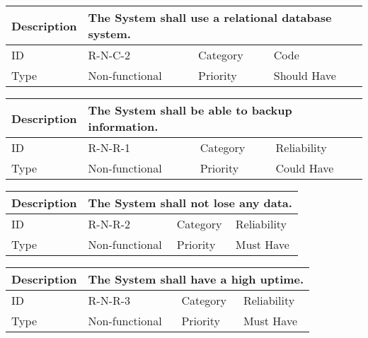 \begin{tabular}{|p{1.5cm}|p{1.5cm}|p{1.5cm}|p{1.5cm}|p{1.5cm}|p{1.5cm}|p{1.5cm}|p{1.5cm}|p{1.5cm}|p{1.5cm}|p{1.5cm}|p{1.5cm}|}
    \hline
    \multicolumn{2}{|o|}{Description} & \multicolumn{10}{p{12.5cm}|}{The System shall use a relational database system.} \\ \hline
    \multicolumn{2}{|o|}{ID}          & \multicolumn{4}{n}{R-N-C-2}            & \multicolumn{2}{|o|}{Category}    & \multicolumn{4}{n|}{Code} \\ \hline
    \multicolumn{2}{|o|}{Type}        & \multicolumn{4}{n}{Non-functional}     & \multicolumn{2}{|o|}{Priority}    & \multicolumn{4}{n|}{Should Have}  \\ \hline
\end{tabular}

\begin{tabular}{|p{1.5cm}|p{1.5cm}|p{1.5cm}|p{1.5cm}|p{1.5cm}|p{1.5cm}|p{1.5cm}|p{1.5cm}|p{1.5cm}|p{1.5cm}|p{1.5cm}|p{1.5cm}|}
    \hline
    \multicolumn{2}{|o|}{Description} & \multicolumn{10}{p{12.5cm}|}{The System shall be able to backup information.} \\ \hline
    \multicolumn{2}{|o|}{ID}          & \multicolumn{4}{n}{R-N-R-1}            & \multicolumn{2}{|o|}{Category}    & \multicolumn{4}{n|}{Reliability} \\ \hline
    \multicolumn{2}{|o|}{Type}        & \multicolumn{4}{n}{Non-functional}     & \multicolumn{2}{|o|}{Priority}    & \multicolumn{4}{n|}{Could Have}  \\ \hline
\end{tabular}

\begin{tabular}{|p{1.5cm}|p{1.5cm}|p{1.5cm}|p{1.5cm}|p{1.5cm}|p{1.5cm}|p{1.5cm}|p{1.5cm}|p{1.5cm}|p{1.5cm}|p{1.5cm}|p{1.5cm}|}
    \hline
    \multicolumn{2}{|o|}{Description} & \multicolumn{10}{p{12.5cm}|}{The System shall not lose any data.} \\ \hline
    \multicolumn{2}{|o|}{ID}          & \multicolumn{4}{n}{R-N-R-2}            & \multicolumn{2}{|o|}{Category}    & \multicolumn{4}{n|}{Reliability} \\ \hline
    \multicolumn{2}{|o|}{Type}        & \multicolumn{4}{n}{Non-functional}     & \multicolumn{2}{|o|}{Priority}    & \multicolumn{4}{n|}{Must Have}  \\ \hline
\end{tabular}

\begin{tabular}{|p{1.5cm}|p{1.5cm}|p{1.5cm}|p{1.5cm}|p{1.5cm}|p{1.5cm}|p{1.5cm}|p{1.5cm}|p{1.5cm}|p{1.5cm}|p{1.5cm}|p{1.5cm}|}
    \hline
    \multicolumn{2}{|o|}{Description} & \multicolumn{10}{p{12.5cm}|}{The System shall have a high uptime.} \\ \hline
    \multicolumn{2}{|o|}{ID}          & \multicolumn{4}{n}{R-N-R-3}            & \multicolumn{2}{|o|}{Category}    & \multicolumn{4}{n|}{Reliability} \\ \hline
    \multicolumn{2}{|o|}{Type}        & \multicolumn{4}{n}{Non-functional}     & \multicolumn{2}{|o|}{Priority}    & \multicolumn{4}{n|}{Must Have}  \\ \hline
\end{tabular}

